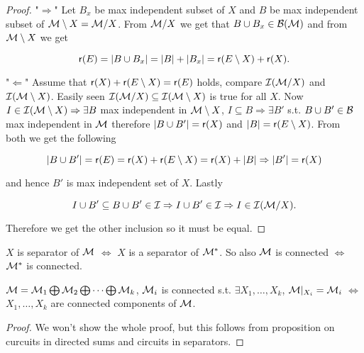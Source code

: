 \begin{proof}
	"$\Rightarrow$" Let $B_{x}$ be max independent subset of $X$ and $B$ be max independent subset of $\mathcal{M} \setminus X = \mathcal{M} / X$. From $\mathcal{M} / X$ we get that $B \cup B_{x} \in \mathcal{B}(\mathcal{M})$ and from $\mathcal{M} \setminus X$ we get

	$$
	\operatorname{\mathsf{r}}(E) = |B \cup B_{x}| = |B| + |B_{x}| = \operatorname{\mathsf{r}}(E \setminus X) + \operatorname{\mathsf{r}}(X).
	$$

	"$\Leftarrow$" Assume that $\operatorname{\mathsf{r}}(X) + \operatorname{\mathsf{r}}(E \setminus X) = \operatorname{\mathsf{r}}(E)$ holds, compare $\mathcal{I}(\mathcal{M} / X)$ and $\mathcal{I}(\mathcal{M} \setminus X)$. Easily seen $\mathcal{I}(\mathcal{M} / X) \subseteq \mathcal{I}(\mathcal{M} \setminus X)$ is true for all $X$. Now $I \in \mathcal{I}(\mathcal{M} \setminus X) \Rightarrow \exists B$ max independent in $\mathcal{M} \setminus X$, $I \subseteq B \Rightarrow \exists B'$ s.t. $B \cup B' \in \mathcal{B}$ max independent in $\mathcal{M}$ therefore $|B \cup B'| = \operatorname{\mathsf{r}}(X)$ and $|B| = \operatorname{\mathsf{r}}(E \setminus X)$. From both we get the following

	$$
	|B \cup B'| = \operatorname{\mathsf{r}}(E) = \operatorname{\mathsf{r}}(X) + \operatorname{\mathsf{r}}(E \setminus X) = \operatorname{\mathsf{r}}(X) + |B| \Rightarrow |B'| = \operatorname{\mathsf{r}}(X)
	$$

	\noindent and hence $B'$ is max independent set of $X$. Lastly

	$$
	I \cup B' \subseteq B \cup B' \in \mathcal{I} \Rightarrow I \cup B' \in \mathcal{I} \Rightarrow I \in \mathcal{I}(\mathcal{M} / X).
	$$

	\noindent Therefore we get the other inclusion so it must be equal.
\end{proof}

\begin{cor}
	$X$ is separator of $\mathcal{M}$ $\iff$ $X$ is a separator of $\mathcal{M}^{\ast}$. So also $\mathcal{M}$ is connected $\iff$ $\mathcal{M}^{\ast}$ is connected.
\end{cor}

\begin{thm}
	$\mathcal{M} = \mathcal{M}_{1} \bigoplus \mathcal{M}_{2} \bigoplus \dots \bigoplus \mathcal{M}_{k}$, $\mathcal{M}_{i}$ is connected s.t. $\exists X_{1}, \dots, X_{k}$, $\mathcal{M} |_{X_{i}} = \mathcal{M}_{i}$ $\iff$ $X_{1}, \dots, X_{k}$ are connected components of $\mathcal{M}$.
\end{thm}

\begin{proof}
	We won't show the whole proof, but this follows from proposition on curcuits in directed sums and circuits in separators.
\end{proof}
